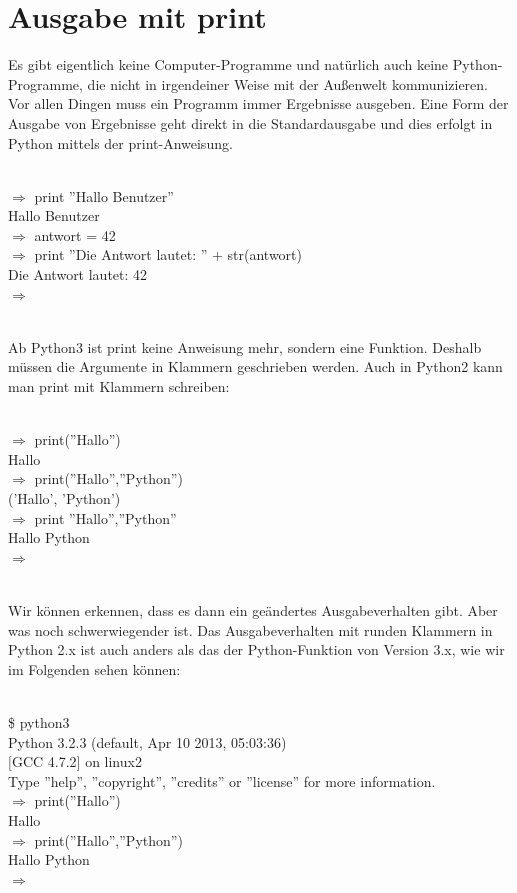 \section{Ausgabe mit print}
Es gibt eigentlich keine Computer-Programme und natürlich auch keine Python-Programme, die nicht in irgendeiner Weise mit der Außenwelt kommunizieren. Vor allen Dingen muss ein Programm immer Ergebnisse ausgeben. Eine Form der Ausgabe von Ergebnisse geht direkt in die Standardausgabe und dies erfolgt in Python mittels der print-Anweisung.\\
\\
\begin{MyConsoleBox}{
${\Longrightarrow}$ print ''Hallo Benutzer'' \\
Hallo Benutzer \\
${\Longrightarrow}$ antwort = 42 \\
${\Longrightarrow}$ print ''Die Antwort lautet: '' + str(antwort) \\
Die Antwort lautet: 42 \\
${\Longrightarrow}$ \\
}\end{MyConsoleBox}
\\
Ab Python3 ist print keine Anweisung mehr, sondern eine Funktion. Deshalb müssen die Argumente in Klammern geschrieben werden. Auch in Python2 kann man print mit Klammern schreiben:\\
\\
\begin{MyConsoleBox}{
${\Longrightarrow}$ print(''Hallo'') \\
Hallo \\
${\Longrightarrow}$ print(''Hallo'',''Python'') \\
('Hallo', 'Python') \\
${\Longrightarrow}$ print ''Hallo'',''Python'' \\
Hallo Python \\
${\Longrightarrow}$ \\ 
}\end{MyConsoleBox}
\\
Wir können erkennen, dass es dann ein geändertes Ausgabeverhalten gibt. Aber was noch schwerwiegender ist. Das Ausgabeverhalten mit runden Klammern in Python 2.x ist auch anders als das der Python-Funktion von Version 3.x, wie wir im Folgenden sehen können: \\
\\
\begin{MyConsoleBox}{
\$ python3 \\
Python 3.2.3 (default, Apr 10 2013, 05:03:36)  \\
$[$GCC 4.7.2$]$ on linux2 \\
Type ''help'', ''copyright'', ''credits'' or ''license'' for more information. \\
${\Longrightarrow}$ print(''Hallo'') \\
Hallo \\
${\Longrightarrow}$ print(''Hallo'',''Python'') \\
Hallo Python \\
${\Longrightarrow}$  \\
}\end{MyConsoleBox}
\\
